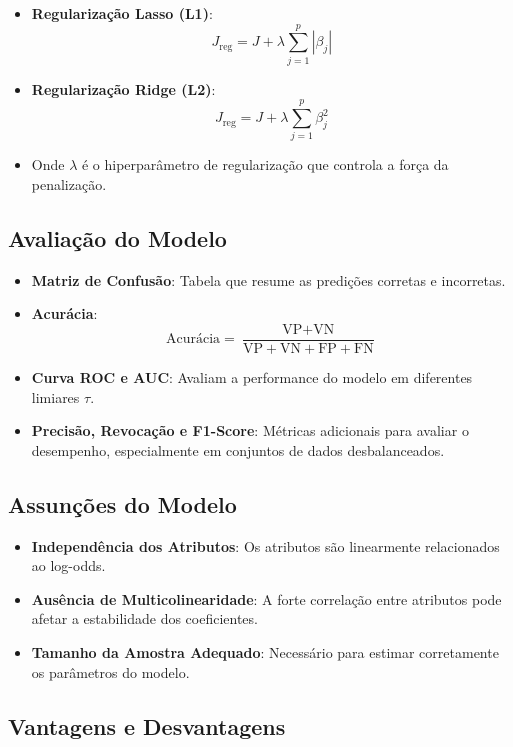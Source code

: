 \documentclass{sciposter}
\begin{document}
\begin{multicols}{3}
\begin{itemize}
    \item \textbf{Regularização Lasso (L1)}:
    \[
    J_{\text{reg}} = J + \lambda \sum_{j=1}^{p} |\beta_j|
    \]
    \item \textbf{Regularização Ridge (L2)}:
    \[
    J_{\text{reg}} = J + \lambda \sum_{j=1}^{p} \beta_j^2
    \]
    \item Onde $\lambda$ é o hiperparâmetro de regularização que controla a força da penalização.
\end{itemize}

\subsection{Avaliação do Modelo}

\begin{itemize}
    \item \textbf{Matriz de Confusão}: Tabela que resume as predições corretas e incorretas.
    \item \textbf{Acurácia}:
    \[
    \text{Acurácia} = \frac{\text{VP} + \text{VN}}{\text{VP} + \text{VN} + \text{FP} + \text{FN}}
    \]
    \item \textbf{Curva ROC e AUC}: Avaliam a performance do modelo em diferentes limiares $\tau$.
    \item \textbf{Precisão, Revocação e F1-Score}: Métricas adicionais para avaliar o desempenho, especialmente em conjuntos de dados desbalanceados.
\end{itemize}

\subsection{Assunções do Modelo}

\begin{itemize}
    \item \textbf{Independência dos Atributos}: Os atributos são linearmente relacionados ao log-odds.
    \item \textbf{Ausência de Multicolinearidade}: A forte correlação entre atributos pode afetar a estabilidade dos coeficientes.
    \item \textbf{Tamanho da Amostra Adequado}: Necessário para estimar corretamente os parâmetros do modelo.
\end{itemize}

\subsection{Vantagens e Desvantagens}


\end{multicols}
\end{document}
